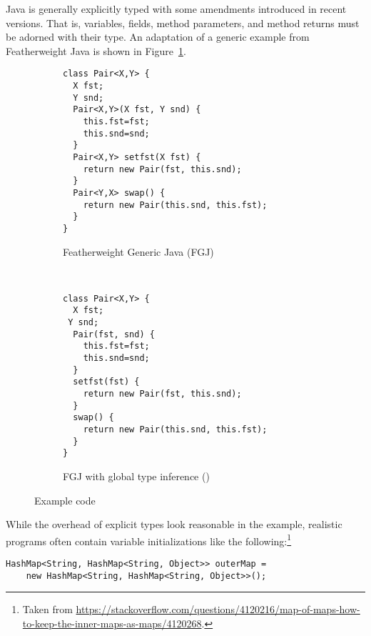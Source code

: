 Java is generally explicitly typed with some amendments introduced in
recent versions. That is, 
variables, fields, method parameters, and method returns must be
adorned with their type. An adaptation of a generic example from Featherweight Java
\cite{DBLP:journals/toplas/IgarashiPW01} 
is shown in Figure~\ref{fig:intro-example-generic-fj}.
\begin{figure}[tp]
  \begin{subfigure}[t]{0.49\linewidth}
\begin{lstlisting}[style=fgj]
class Pair<X,Y> {
  X fst;
  Y snd;
  Pair<X,Y>(X fst, Y snd) {
    this.fst=fst;
    this.snd=snd;
  }
  Pair<X,Y> setfst(X fst) {
    return new Pair(fst, this.snd);
  }
  Pair<Y,X> swap() {
    return new Pair(this.snd, this.fst);
  }
}  
\end{lstlisting}
    \caption{Featherweight Generic Java (FGJ)}
    \label{fig:intro-example-generic-fj}
  \end{subfigure}
  ~
  \begin{subfigure}[t]{0.49\linewidth}
\begin{lstlisting}[style=tfgj]
class Pair<X,Y> {
  X fst;
 Y snd;
  Pair(fst, snd) {
    this.fst=fst; 
    this.snd=snd;
  }
  setfst(fst) {
    return new Pair(fst, this.snd);
  }
  swap() {
    return new Pair(this.snd, this.fst);
  }
}  
\end{lstlisting}
    \caption{FGJ with global type inference (\TFGJ)}
    \label{fig:intro-example-generic-jtx}
  \end{subfigure}
  \caption{Example code}
  \label{fig:intro-example-code}
\end{figure}
While the overhead of explicit types look reasonable in the example,
realistic programs often contain variable initializations like
the following:\footnote{Taken from
  \url{https://stackoverflow.com/questions/4120216/map-of-maps-how-to-keep-the-inner-maps-as-maps/4120268}.} 
\begin{lstlisting}[basicstyle=\ttfamily\fontsize{8}{9.6}\selectfont,style=fgj]
  HashMap<String, HashMap<String, Object>> outerMap =
    new HashMap<String, HashMap<String, Object>>();
\end{lstlisting}

